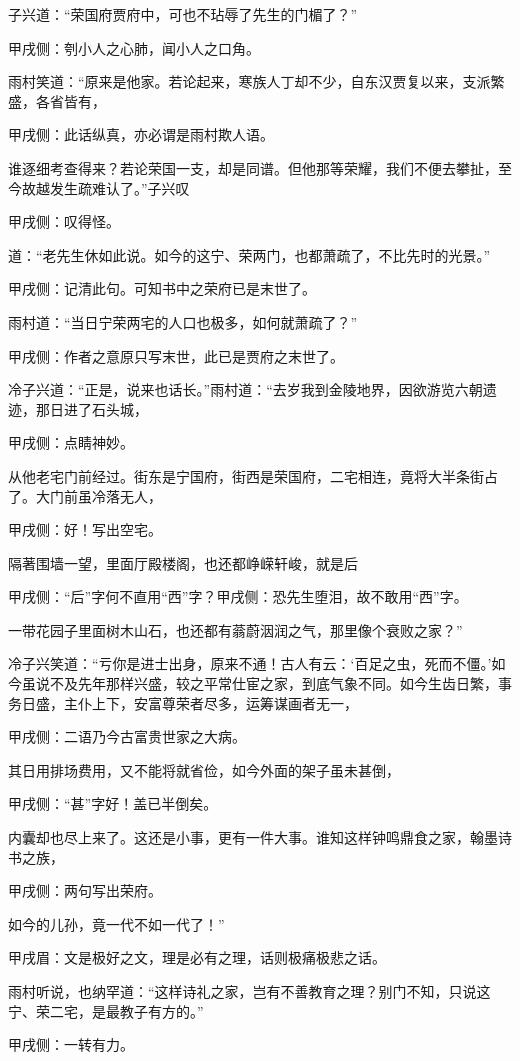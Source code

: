 \begin{parag}
    子兴道：“荣国府贾府中，可也不玷辱了先生的门楣了？”\begin{note}甲戌侧：刳小人之心肺，闻小人之口角。\end{note}雨村笑道：“原来是他家。若论起来，寒族人丁却不少，自东汉贾复以来，支派繁盛，各省皆有，\begin{note}甲戌侧：此话纵真，亦必谓是雨村欺人语。\end{note}谁逐细考查得来？若论荣国一支，却是同谱。但他那等荣耀，我们不便去攀扯，至今故越发生疏难认了。”子兴叹\begin{note}甲戌侧：叹得怪。\end{note}道：“老先生休如此说。如今的这宁、荣两门，也都萧疏了，不比先时的光景。”\begin{note}甲戌侧：记清此句。可知书中之荣府已是末世了。\end{note}雨村道：“当日宁荣两宅的人口也极多，如何就萧疏了？”\begin{note}甲戌侧：作者之意原只写末世，此已是贾府之末世了。\end{note}冷子兴道：“正是，说来也话长。”雨村道：“去岁我到金陵地界，因欲游览六朝遗迹，那日进了石头城，\begin{note}甲戌侧：点睛神妙。\end{note}从他老宅门前经过。街东是宁国府，街西是荣国府，二宅相连，竟将大半条街占了。大门前虽冷落无人，\begin{note}甲戌侧：好！写出空宅。\end{note}隔著围墙一望，里面厅殿楼阁，也还都峥嵘轩峻，就是后\begin{note}甲戌侧：“后”字何不直用“西”字？甲戌侧：恐先生堕泪，故不敢用“西”字。\end{note}一带花园子里面树木山石，也还都有蓊蔚洇润之气，那里像个衰败之家？”
\end{parag}


\begin{parag}
    冷子兴笑道：“亏你是进士出身，原来不通！古人有云：‘百足之虫，死而不僵。’如今虽说不及先年那样兴盛，较之平常仕宦之家，到底气象不同。如今生齿日繁，事务日盛，主仆上下，安富尊荣者尽多，运筹谋画者无一，\begin{note}甲戌侧：二语乃今古富贵世家之大病。\end{note}其日用排场费用，又不能将就省俭，如今外面的架子虽未甚倒，\begin{note}甲戌侧：“甚”字好！盖已半倒矣。\end{note}内囊却也尽上来了。这还是小事，更有一件大事。谁知这样钟鸣鼎食之家，翰墨诗书之族，\begin{note}甲戌侧：两句写出荣府。\end{note}如今的儿孙，竟一代不如一代了！”\begin{note}甲戌眉：文是极好之文，理是必有之理，话则极痛极悲之话。\end{note}雨村听说，也纳罕道：“这样诗礼之家，岂有不善教育之理？别门不知，只说这宁、荣二宅，是最教子有方的。”\begin{note}甲戌侧：一转有力。\end{note}
\end{parag}


